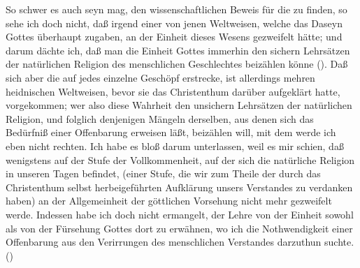 \begin{aufza}
\item So schwer es auch seyn mag, den wissenschaftlichen Beweis für die  zu finden, so sehe ich doch nicht, daß irgend einer von jenen Weltweisen, welche das Daseyn Gottes überhaupt zugaben, an der Einheit dieses Wesens gezweifelt hätte; und darum dächte ich, daß man die Einheit Gottes immerhin den sichern Lehrsätzen der natürlichen Religion des menschlichen Geschlechtes beizählen könne (). Daß sich aber die  auf jedes einzelne Geschöpf erstrecke, ist allerdings mehren heidnischen Weltweisen, bevor sie das Christenthum darüber aufgeklärt hatte,  vorgekommen; wer also diese Wahrheit den unsichern Lehrsätzen der natürlichen Religion, und folglich denjenigen Mängeln derselben, aus denen sich das Bedürfniß einer Offenbarung erweisen läßt, beizählen will, mit dem werde ich eben nicht rechten. Ich habe es bloß darum unterlassen, weil es mir schien, daß wenigstens auf der Stufe der Vollkommenheit, auf der sich die natürliche Religion in unseren Tagen befindet, (einer Stufe, die wir zum Theile der durch das Christenthum selbst herbeigeführten Aufklärung unsers Verstandes zu verdanken haben) an der Allgemeinheit der göttlichen Vorsehung nicht mehr gezweifelt werde. Indessen habe ich doch nicht ermangelt, der Lehre von der Einheit sowohl als von der Fürsehung Gottes dort zu erwähnen, wo ich die Nothwendigkeit einer Offenbarung aus den Verirrungen des menschlichen Verstandes darzuthun suchte. ()
\end{aufza}
   
